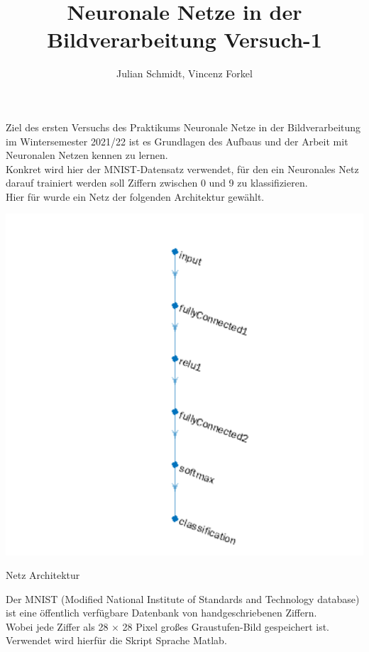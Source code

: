 \documentclass[8pt,a4paper]{article}
\title{Neuronale Netze in der Bildverarbeitung Versuch-1}
\author{Julian Schmidt, Vincenz Forkel}
\begin{document}
\maketitle
\newpage
Ziel des ersten Versuchs des Praktikums Neuronale Netze in der Bildverarbeitung im Wintersemester 2021/22 ist es Grundlagen des Aufbaus und der Arbeit mit Neuronalen Netzen kennen zu lernen.\\
Konkret wird hier der MNIST-Datensatz verwendet, für den ein Neuronales Netz darauf trainiert werden soll Ziffern zwischen 0 und 9 zu klassifizieren.\\
Hier für wurde ein Netz der folgenden Architektur gewählt.\\

\begin{center}
    

    \includegraphics[scale = 0.4]{model.png}
    \caption{Netz Architektur}
\end{center}


Der MNIST (Modified National Institute of Standards and Technology database) ist eine öffentlich verfügbare Datenbank von handgeschriebenen Ziffern.\\
Wobei jede Ziffer als 28 × 28 Pixel großes Graustufen-Bild gespeichert ist.\\

Verwendet wird hierfür die Skript Sprache Matlab.\\
\end{document}
